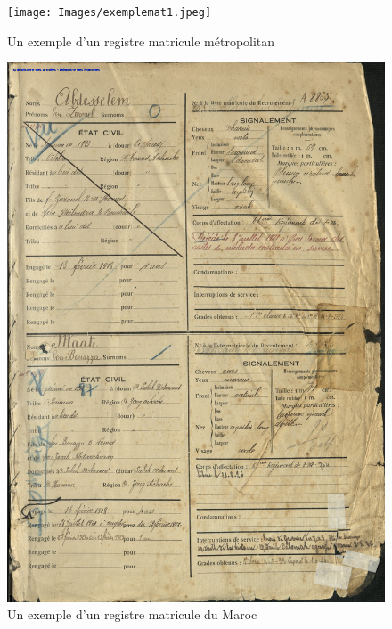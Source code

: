   \begin{figure}[h!]
    \begin{center}
      \texttt{[image: Images/exemplemat1.jpeg]}
        \caption[Note d'image]{Un exemple d'un registre matricule métropolitan\footnotemark}
    \label{fig:Mat 1}
    \end{center}
  \end{figure}
  \begin{figure}[h!]
    \begin{center}
      \includegraphics[scale=0.57]{Images/exemplemat2.jpeg}
        \caption[Note d'image]{Un exemple d'un registre matricule du Maroc\footnotemark}
    \label{fig:Mat 2}
    \end{center}
  \end{figure}


